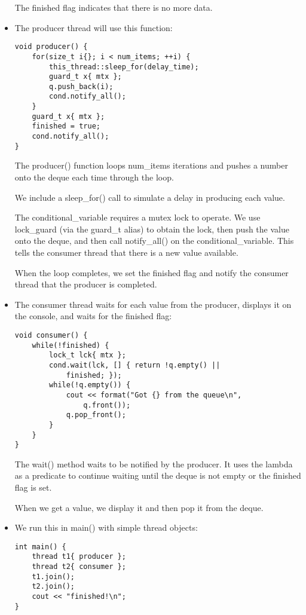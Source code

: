 \begin{itemize}
The finished flag indicates that there is no more data.

\item 
The producer thread will use this function:

\begin{lstlisting}[style=styleCXX]
void producer() {
	for(size_t i{}; i < num_items; ++i) {
		this_thread::sleep_for(delay_time);
		guard_t x{ mtx };
		q.push_back(i);
		cond.notify_all();
	}
	guard_t x{ mtx };
	finished = true;
	cond.notify_all();
}
\end{lstlisting}

The producer() function loops num\_items iterations and pushes a number onto the deque each time through the loop.

We include a sleep\_for() call to simulate a delay in producing each value.

The conditional\_variable requires a mutex lock to operate. We use lock\_guard (via the guard\_t alias) to obtain the lock, then push the value onto the deque, and then call notify\_all() on the conditional\_variable. This tells the consumer thread that there is a new value available.

When the loop completes, we set the finished flag and notify the consumer thread that the producer is completed.

\item 
The consumer thread waits for each value from the producer, displays it on the console, and waits for the finished flag:

\begin{lstlisting}[style=styleCXX]
void consumer() {
	while(!finished) {
		lock_t lck{ mtx };
		cond.wait(lck, [] { return !q.empty() ||
			finished; });
		while(!q.empty()) {
			cout << format("Got {} from the queue\n",
				q.front());
			q.pop_front();
		}
	}
}
\end{lstlisting}

The wait() method waits to be notified by the producer. It uses the lambda as a predicate to continue waiting until the deque is not empty or the finished flag is set.

When we get a value, we display it and then pop it from the deque.

\item 
We run this in main() with simple thread objects:

\begin{lstlisting}[style=styleCXX]
int main() {
	thread t1{ producer };
	thread t2{ consumer };
	t1.join();
	t2.join();
	cout << "finished!\n";
}
\end{lstlisting}


\end{itemize}
